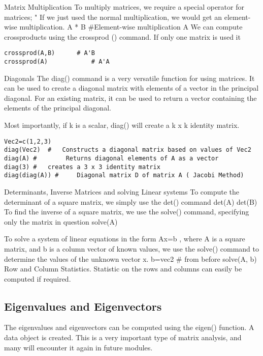 \documentclass[a4paper,12pt]{article}
\begin{document}
\begin{itemize}
Matrix Multiplication
To multiply matrices, we require a special operator for matrices; "%
If we just used the normal multiplication, we would get an element-wise multiplication.
A * B  		#Element-wise multiplication
A %
We can compute crossproducts using the crossprod () command. If only one matrix is used it
\begin{framed}
\begin{verbatim}
crossprod(A,B) 		# A'B
crossprod(A) 			# A'A
\end{verbatim}
\end{framed}
Diagonals
The diag() command is a very versatile function for using matrices.
It can be used to create a diagonal matrix with elements of a vector in the principal diagonal. For an existing matrix, it can be used to return a vector containing the elements of the principal diagonal.


Most importantly, if k is a scalar, diag() will create a k x k identity matrix.

\begin{framed}
\begin{verbatim}
Vec2=c(1,2,3)
diag(Vec2)	#	Constructs a diagonal matrix based on values of Vec2
diag(A)	#        Returns diagonal elements of A as a vector
diag(3)	#	creates a 3 x 3 identity matrix
diag(diag(A)) #  	Diagonal matrix D of matrix A ( Jacobi Method)
\end{verbatim}
\end{framed}
Determinants, Inverse Matrices and solving Linear systems
To compute the determinant of a square matrix, we simply use the det() command
det(A)
det(B)
To find the inverse of a square matrix, we use the solve() command, specifying only the matrix in question
solve(A)

To solve a system of linear equations in the form Ax=b , where A is a square matrix, and b is a column vector of known values, we use the solve() command to determine the values of the unknown vector x.
b=vec2  # from before
solve(A, b)
Row and Column Statistics.
Statistic on the rows and columns can easily be computed if required.
\subsection{Eigenvalues and Eigenvectors}
The eigenvalues and eigenvectors can be computed using the eigen() function.  A data object is created.
This is a very important type of matrix analysis, and many will encounter it again in future modules.


\end{itemize}
\end{document}
